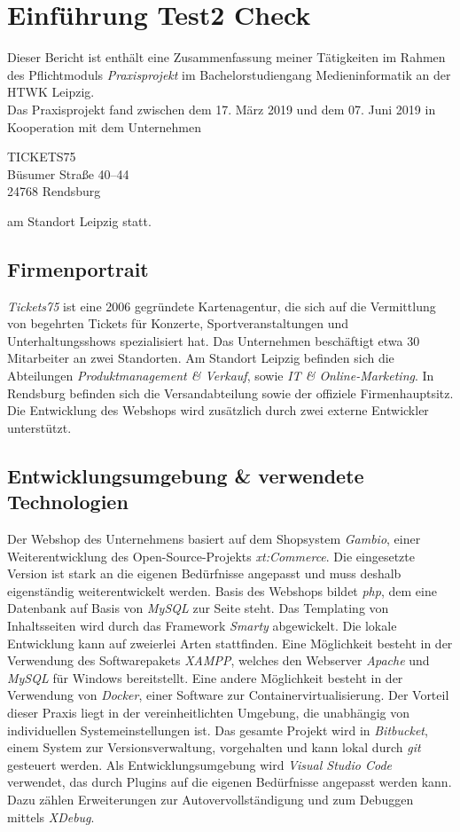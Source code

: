 \chapter{Einführung Test2 Check}\label{ch:einführung}
Dieser Bericht ist enthält eine Zusammenfassung meiner Tätigkeiten im Rahmen des Pflichtmoduls \textit{Praxisprojekt} im Bachelorstudiengang Medieninformatik an der HTWK Leipzig.\\
Das Praxisprojekt fand zwischen dem 17. März 2019 und dem 07. Juni 2019 in Kooperation mit dem Unternehmen
\begin{center}
	TICKETS75\\
	Büsumer Straße 40–44\\
	24768 Rendsburg
\end{center}
am Standort Leipzig statt.

\section{Firmenportrait}
\textit{Tickets75} ist eine 2006 gegründete Kartenagentur, die sich auf die Vermittlung von begehrten Tickets für Konzerte, Sportveranstaltungen und Unterhaltungsshows spezialisiert hat.
Das Unternehmen beschäftigt etwa 30 Mitarbeiter an zwei Standorten. Am Standort Leipzig befinden sich die Abteilungen \textit{Produktmanagement \& Verkauf}, sowie \textit{IT \& Online-Marketing}. 
In Rendsburg befinden sich die Versandabteilung sowie der offiziele Firmenhauptsitz. Die Entwicklung des Webshops wird zusätzlich durch zwei externe Entwickler
unterstützt.

\section{Entwicklungsumgebung \& verwendete Technologien}
Der Webshop des Unternehmens basiert auf dem Shopsystem \textit{Gambio}, einer Weiterentwicklung des Open-Source-Projekts \textit{xt:Commerce}. 
Die eingesetzte Version ist stark an die eigenen Bedürfnisse angepasst und muss deshalb eigenständig weiterentwickelt werden. Basis des Webshops bildet \textit{php}, 
dem eine Datenbank auf Basis von \textit{MySQL} zur Seite steht. Das Templating von Inhaltsseiten wird durch das Framework \textit{Smarty} abgewickelt. 
Die lokale Entwicklung kann auf zweierlei Arten stattfinden. Eine Möglichkeit besteht in der Verwendung des Softwarepakets \textit{XAMPP}, 
welches den Webserver \textit{Apache} und \textit{MySQL} für Windows bereitstellt. Eine andere Möglichkeit besteht in der Verwendung von \textit{Docker}, 
einer Software zur Containervirtualisierung. Der Vorteil dieser Praxis liegt in der vereinheitlichten Umgebung, die unabhängig von individuellen Systemeinstellungen ist. 
Das gesamte Projekt wird in \textit{Bitbucket}, einem System zur Versionsverwaltung, vorgehalten und kann lokal durch \textit{git} gesteuert werden. 
Als Entwicklungsumgebung wird \textit{Visual Studio Code} verwendet, das durch Plugins auf die eigenen Bedürfnisse angepasst werden kann. 
Dazu zählen Erweiterungen zur Autovervollständigung und zum Debuggen mittels \textit{XDebug}.

